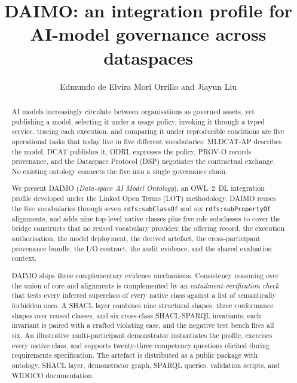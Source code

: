 \documentclass[Afour,sagev,times]{sagej}
\newcommand{\code}[1]{\texttt{#1}}
\begin{document}

\title{DAIMO: an integration profile for AI-model governance across dataspaces}

\author{Edmundo de Elvira Mori Orrillo and Jiayun Liu}




\begin{abstract}
AI models increasingly circulate between organisations as governed assets, yet publishing a model, selecting it under a usage policy, invoking it through a typed service, tracing each execution, and comparing it under reproducible conditions are five operational tasks that today live in five different vocabularies: MLDCAT-AP describes the model, DCAT publishes it, ODRL expresses the policy, PROV-O records provenance, and the Dataspace Protocol (DSP) negotiates the contractual exchange. No existing ontology connects the five into a single governance chain.

We present DAIMO (\emph{Data-space AI Model Ontology}), an OWL~2~DL integration profile developed under the Linked Open Terms (LOT) methodology. DAIMO reuses the five vocabularies through seven \code{rdfs:subClassOf} and six \code{rdfs:subPropertyOf} alignments, and adds nine top-level native classes plus five role subclasses to cover the bridge constructs that no reused vocabulary provides: the offering record, the execution authorisation, the model deployment, the derived artefact, the cross-participant provenance bundle, the I/O contract, the audit evidence, and the shared evaluation context.

DAIMO ships three complementary evidence mechanisms. Consistency reasoning over the union of core and alignments is complemented by an \emph{entailment-verification check} that tests every inferred superclass of every native class against a list of semantically forbidden ones. A SHACL layer combines nine structural shapes, three conformance shapes over reused classes, and six cross-class SHACL-SPARQL invariants; each invariant is paired with a crafted violating case, and the negative test bench fires all six. An illustrative multi-participant demonstrator instantiates the profile, exercises every native class, and supports twenty-three competency questions elicited during requirements specification. The artefact is distributed as a public package with ontology, SHACL layer, demonstrator graph, SPARQL queries, validation scripts, and WIDOCO documentation.
\end{abstract}
\end{document}
